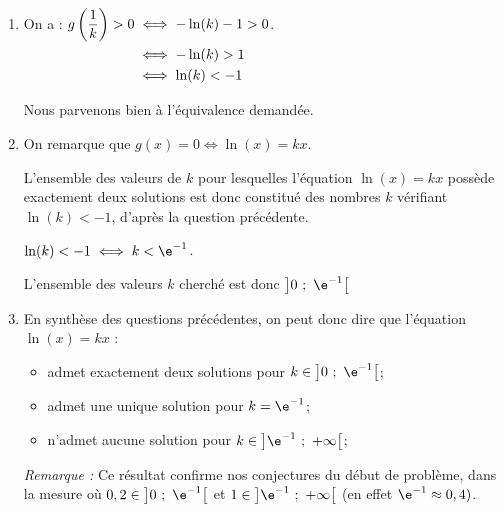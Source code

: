 \begin{enumerate}
\begin{enumerate}
\item On a :
$\aligned[t] g\left(\dfrac 1k\right) > 0 &\iff -\ln(k) - 1 > 0\\
&\iff -\ln (k) >  1\\
&\iff \ln(k) < -1 \\ \endaligned$.

Nous parvenons bien à l'équivalence demandée.

\item On remarque que $g(x) = 0 \iff \ln(x) = kx$.

L'ensemble des valeurs de $k$ pour lesquelles l'équation $\ln (x) = kx$ possède exactement deux solutions est donc constitué des nombres $k$ vérifiant $\ln(k) < -1$, d'après la question précédente.

$\ln(k) < -1 \iff k < \e^{-1}$.

L'ensemble des valeurs $k$ cherché est donc $\left]0~;~\e^{-1}\right[ $
	\item En synthèse des questions précédentes, on peut donc dire que  l'équation $\ln (x) = kx$ :
			\begin{itemize}
				\item admet exactement deux solutions pour $ k\in \left]0~;~\e^{-1}\right[$;
				\item admet une unique solution pour $ k = \e^{-1}$;
				\item n'admet aucune solution pour $ k\in \left]\e^{-1}~;~+\infty\right[$;
			\end{itemize}
		\emph{Remarque :} Ce résultat confirme nos conjectures du début de problème, dans la mesure où $0,2 \in \left]0~;~\e^{-1}\right[$ et $1\in \left]\e^{-1}~;~+\infty\right[$ (en effet $\e^{-1}\approx 0,4)$.
		\end{enumerate}
	\end{enumerate}

	\medskip

